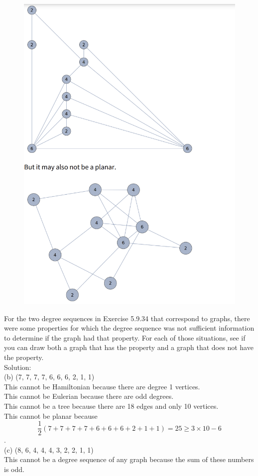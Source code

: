 \documentclass{article}
\begin{document}
\begin{figure}[H]
    \centering
    \includegraphics{0118}
\end{figure}
For the two degree sequences in Exercise 5.9.34 that correspond to graphs, there were some properties for which the degree sequence was not sufficient information to determine if the graph had that property. For each of those situations, see if you can draw both a graph that has the property and a graph that does not have the property.\\
Solution:\\
(b) (7, 7, 7, 7, 6, 6, 6, 2, 1, 1)\\
This cannot be Hamiltonian because there are degree 1 vertices.\\
This cannot be Eulerian because there are odd degrees.\\
This cannot be a tree because there are 18 edges and only 10 vertices.\\
This cannot be planar because
$$\frac{1}{2}(7 + 7 + 7 + 7 + 6 + 6 + 6 + 2 + 1 + 1) =25\ge 3\times 10-6$$.\\
(c) (8, 6, 4, 4, 4, 3, 2, 2, 1, 1)\\
This cannot be a degree sequence of any graph because the sum of these numbers is odd.
\end{document}
